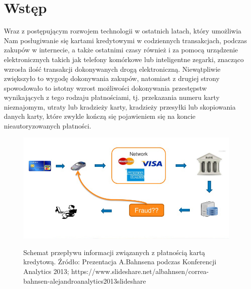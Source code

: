 \documentclass[inzynierska]{pwr_wmat_praca_dyplomowa}
\theoremstyle{plain}
\numberwithin{theorem}{chapter}
\theoremstyle{definition}
\numberwithin{theorem}{chapter}
\begin{document}
\frontmatter
\maketitle
\mainmatter
\tableofcontents
	
\newcommand{\htx}{h_{\theta}(\boldsymbol{x_i})}
\newcommand{\es}{\mathcal{S}}
\newcommand{\ef}{\mathcal{F}}
\newcommand{\iks}{\boldsymbol{x}}
\newcommand{\bes}{\boldsymbol{S}}
\newcommand{\yht}[1]{y_i^{(#1)}}
\newcommand{\ylab}[2]{\text{#1}_{\text{#2}}}

\newenvironment{talign}
{\align}
{\endalign}

\newenvironment{talign*}
{\csname align*\endcsname}
{\endalign}

\chapter*{Wstęp}
Wraz z postępującym rozwojem technologii w ostatnich latach, który umożliwia Nam posługiwanie się kartami kredytowymi w codziennych transakcjach, podczas zakupów w internecie, a także ostatnimi czasy również i za pomocą urządzenie elektronicznych takich jak telefony komórkowe lub inteligentne zegarki, znacząco wzrosła ilość transakcji dokonywanych drogą elektroniczną. Niewątpliwie zwiększyło to wygodę dokonywania zakupów, natomiast z drugiej strony spowodowało to istotny wzrost możliwości dokonywania przestępstw wynikających z tego rodzaju płatnościami, tj. przekazania numeru karty nieznajomym, utraty lub kradzieży karty, kradzieży przesyłki lub skopiowania danych karty, które zwykle kończą się pojawieniem się na koncie nieautoryzowanych płatności.

\begin{figure}[h]
	\includegraphics[width=\linewidth]{images/credit-card-flow.jpg}
	\label{credit-card-flow}
	\caption{Schemat przepływu informacji związanych z płatnością kartą kredytową. Źródło: Prezentacja A.Bahnsena podczas Konferencji Analytics 2013; https://www.slideshare.net/albahnsen/correa-bahnsen-alejandroanalytics2013slideshare}
\end{figure}
\end{document}
